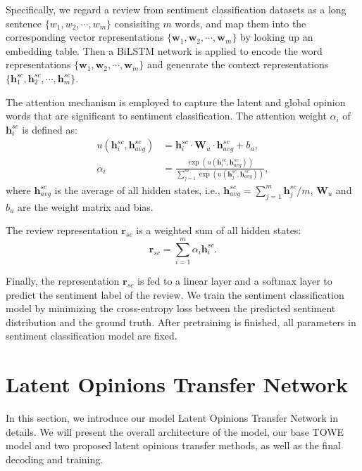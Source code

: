 \documentclass[letterpaper]{article} \usepackage{aaai20}  \usepackage{times}  \usepackage{helvet} \usepackage{courier}  \usepackage[hyphens]{url}  \usepackage{graphicx} \urlstyle{rm} \def\UrlFont{\rm}  \usepackage{graphicx}
\begin{document}
Specifically, we regard a review from sentiment classification datasets as a long sentence $\{w_1, w_2, \cdots, w_m\}$ consisiting $m$ words, and map them into the corresponding vector representations $\{\mathbf{w}_1, \mathbf{w}_2, \cdots, \mathbf{w}_m\}$ by looking up an embedding table. Then a BiLSTM network is applied to encode the word representations $\{\mathbf{w}_1, \mathbf{w}_2, \cdots, \mathbf{w}_m\}$ and genenrate the context representations $\{\mathbf{h}_1^{sc}, \mathbf{h}_2^{sc}, \cdots, \mathbf{h}_m^{sc}\}$.

The attention mechanism is employed to capture the latent and global opinion words that are significant to sentiment classification. The attention weight $\alpha_i$ of $\mathbf{h}_i^{sc}$ is defined as:
\begin{align}
	u(\mathbf{h}_i^{sc}, \mathbf{h}_{avg}^{sc} ) &= \mathbf{h}_i^{sc} \cdot \mathbf{W}_{u} \cdot \mathbf{h}_{avg}^{sc} + b_{u}, \\
	\alpha_i &= \frac{\exp(u(\mathbf{h}_i^{sc}, \mathbf{h}_{avg}^{sc} ))}{\sum_{j=1}^{m} \exp(u(\mathbf{h}_j^{sc}, \mathbf{h}_{avg}^{sc}) )},
\end{align}
where $\mathbf{h}_{avg}^{sc}$ is the average of all hidden states, i.e., $\mathbf{h}_{avg}^{sc} = \sum_{j=1}^{m} \mathbf{h}_{j}^{sc}/m$, $\mathbf{W}_{u}$ and $b_u$ are the weight matrix and bias.

The review representation $\mathbf{r}_{sc}$ is a weighted sum of all hidden states:
\begin{equation}
	\mathbf{r}_{sc} = \sum_{i=1}^{m}\alpha_i \mathbf{h}_i^{sc}.
\end{equation}

Finally, the representation $\mathbf{r}_{sc}$ is fed to a linear layer and a softmax layer to predict the sentiment label of the review. We train the sentiment classification model by minimizing the cross-entropy loss between the predicted sentiment distribution and the ground truth. After pretraining is finished, all parameters in sentiment classification model are fixed.

\section{Latent Opinions Transfer Network}
In this section, we introduce our model Latent Opinions Transfer Network in details. We will present the overall architecture of the model, our base TOWE model and two proposed latent opinions transfer methods, as well as the final decoding and training.
\end{document}
